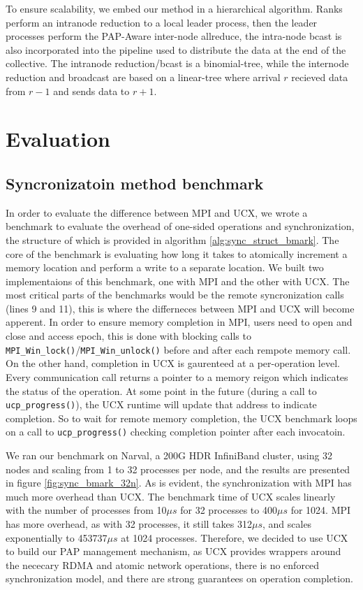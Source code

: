 To ensure scalability, we embed our method in a hierarchical algorithm. 
Ranks perform an intranode reduction to a local leader process, then the leader processes perform the PAP-Aware inter-node allreduce, the intra-node bcast is also incorporated into the pipeline used to distribute the data at the end of the collective. 
The intranode reduction/bcast is a binomial-tree, while the internode reduction and broadcast are based on a linear-tree where arrival $r$ recieved data from $r-1$ and sends data to $r+1$.

\section{Evaluation}
\subsection{Syncronizatoin method benchmark}
In order to evaluate the difference between MPI and UCX, we wrote a benchmark to evaluate the overhead of one-sided operations and synchronization, the structure of which is provided in algorithm \ref{alg:sync_struct_bmark}.
The core of the benchmark is evaluating how long it takes to atomically increment a memory location and perform a write to a separate location.
We built two implementaions of this benchmark, one with MPI and the other with UCX. 
The most critical parts of the benchmarks would be the remote syncronization calls (lines 9 and 11), this is where the differneces between MPI and UCX will become apperent.  
In order to ensure memory completion in MPI, users need to open and close and access epoch, this is done with blocking calls to \texttt{MPI\_Win\_lock()}/\texttt{MPI\_Win\_unlock()} before and after each rempote memory call.
On the other hand, completion in UCX is gaurenteed at a per-operation level. 
Every communication call returns a pointer to a memory reigon which indicates the status of the operation. 
At some point in the future (during a call to \texttt{ucp\_progress()}), the UCX runtime will update that address to indicate completion.
So to wait for remote memory completion, the UCX benchmark loops on a call to \texttt{ucp\_progress()} checking completion pointer after each invocatoin.

We ran our benchmark on Narval, a 200G HDR InfiniBand cluster, using 32 nodes and scaling from 1 to 32 processes per node, and the results are presented in figure \ref{fig:sync_bmark_32n}.
As is evident, the synchronization with MPI has much more overhead than UCX.
The benchmark time of UCX scales linearly with the number of processes from 10$\mu s$ for 32 processes to 400$\mu s$ for 1024.
MPI has more overhead, as with 32 processes, it still takes 312$\mu s$, and scales exponentially to 453737$\mu s$ at 1024 processes.
Therefore, we decided to use UCX to build our PAP management mechanism, as UCX provides wrappers around the nececary RDMA and atomic network operations, there is no enforced synchronization model, and there are strong guarantees on operation completion. 

